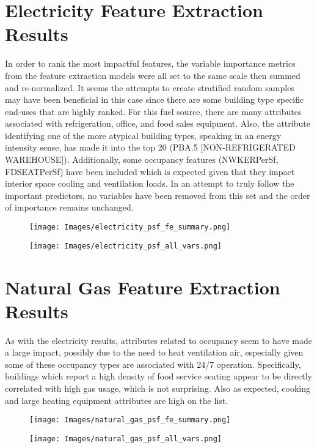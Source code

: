 \documentclass[12pt,letterpaper]{article}
\begin{document}
\section*{Electricity Feature Extraction Results}
In order to rank the most impactful features, the variable importance metrics from the feature extraction models were all set to the same scale then summed and re‐normalized. It seems the attempts to create stratified random samples may have been beneficial in this case since there are some building type specific end‐uses that are highly ranked. For this fuel source, there are many attributes associated with refrigeration, office, and food sales equipment. Also, the attribute identifying one of the more atypical building types, speaking in an energy intensity sense, has made it
into the top 20 (PBA.5 [NON‐REFRIGERATED WAREHOUSE]). Additionally, some occupancy features (NWKERPerSf, FDSEATPerSf) have been included which is expected given that they impact interior space cooling and ventilation loads. In an attempt to truly follow the important predictors, no variables have been removed from this set and the order of importance remains unchanged.
\begin{figure}[h]
\centering
\texttt{[image: Images/electricity\_psf\_fe\_summary.png]}
\end{figure}
\begin{figure}[h]
\centering
\texttt{[image: Images/electricity\_psf\_all\_vars.png]}
\end{figure}
\FloatBarrier
\section*{Natural Gas Feature Extraction Results}
As with the electricity results, attributes related to occupancy seem to have made a large impact, possibly due to the need to heat ventilation air, especially given some of these occupancy types are associated with 24/7 operation. Specifically, buildings which report a high density of food service seating appear to be directly correlated with high gas usage, which is not surprising. Also as expected, cooking and large heating equipment attributes are high on the list.
\begin{figure}[h]
\centering
\texttt{[image: Images/natural\_gas\_psf\_fe\_summary.png]}
\end{figure}
\begin{figure}[h]
\centering
\texttt{[image: Images/natural\_gas\_psf\_all\_vars.png]}
\end{figure}
\FloatBarrier
\end{document}

